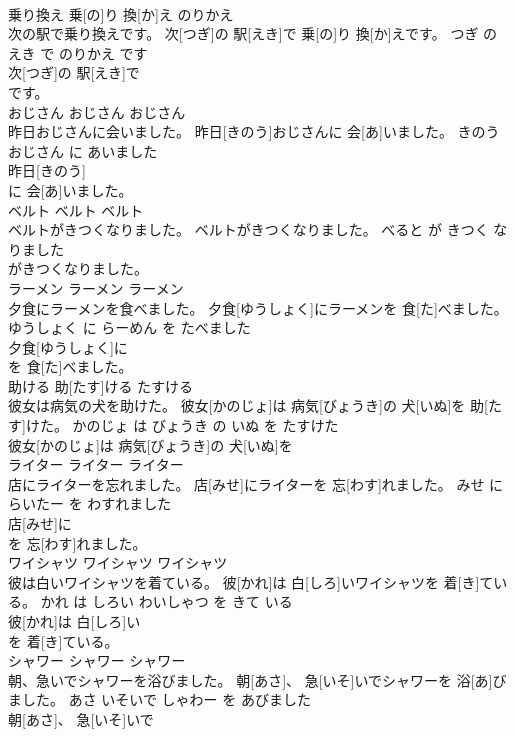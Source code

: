 \documentclass[8pt]{extreport}
\begin{document}
\begin{CJK}{UTF8}{min}
\\	乗り換え	乗[の]り 換[か]え	のりかえ	
\\	次の駅で乗り換えです。	次[つぎ]の 駅[えき]で 乗[の]り 換[か]えです。	つぎ の えき で のりかえ です	
\\	次[つぎ]の 駅[えき]で
\\	です。			
\\	おじさん	おじさん	おじさん	
\\	昨日おじさんに会いました。	昨日[きのう]おじさんに 会[あ]いました。	きのう おじさん に あいました	
\\	昨日[きのう]
\\	に 会[あ]いました。			
\\	ベルト	ベルト	ベルト	
\\	ベルトがきつくなりました。	ベルトがきつくなりました。	べると が きつく なりました	
\\	がきつくなりました。			
\\	ラーメン	ラーメン	ラーメン	
\\	夕食にラーメンを食べました。	夕食[ゆうしょく]にラーメンを 食[た]べました。	ゆうしょく に らーめん を たべました	
\\	夕食[ゆうしょく]に
\\	を 食[た]べました。			
\\	助ける	助[たす]ける	たすける	
\\	彼女は病気の犬を助けた。	彼女[かのじょ]は 病気[びょうき]の 犬[いぬ]を 助[たす]けた。	かのじょ は びょうき の いぬ を たすけた	
\\	彼女[かのじょ]は 病気[びょうき]の 犬[いぬ]を
\\	ライター	ライター	ライター	
\\	店にライターを忘れました。	店[みせ]にライターを 忘[わす]れました。	みせ に らいたー を わすれました	
\\	店[みせ]に
\\	を 忘[わす]れました。			
\\	ワイシャツ	ワイシャツ	ワイシャツ	
\\	彼は白いワイシャツを着ている。	彼[かれ]は 白[しろ]いワイシャツを 着[き]ている。	かれ は しろい わいしゃつ を きて いる	
\\	彼[かれ]は 白[しろ]い
\\	を 着[き]ている。			
\\	シャワー	シャワー	シャワー	
\\	朝、急いでシャワーを浴びました。	朝[あさ]、 急[いそ]いでシャワーを 浴[あ]びました。	あさ いそいで しゃわー を あびました	
\\	朝[あさ]、 急[いそ]いで

\end{CJK}
\end{document}
